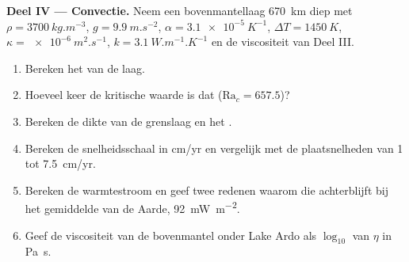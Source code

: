 \begin{problem}
\medskip\noindent\textbf{Deel IV --- Convectie.} Neem een bovenmantellaag
\qty{670}{km} diep met $\rho = \qty{3700}{kg.m^{-3}}$, $g =
\qty{9.9}{m.s^{-2}}$, $\alpha = \qty{3.1e-5}{K^{-1}}$, $\Delta T =
\qty{1450}{K}$, $\kappa = \qty{e-6}{m^2.s^{-1}}$, $k = \qty{3.1}{W.m^{-1}.K^{-1}}$
en de viscositeit van Deel III.
\begin{enumerate}[resume]
  \item Bereken het  van de laag.
  \item Hoeveel keer de kritische waarde is dat ($\mathrm{Ra}_c = 657.5$)?
  \item Bereken de dikte van de grenslaag en het .
  \item Bereken de snelheidsschaal in \unit{cm/yr} en vergelijk met de plaatsnelheden
        van 1 tot \qty{7.5}{cm/yr}.
  \item Bereken de warmtestroom en geef twee redenen waarom die achterblijft bij het
        gemiddelde van de Aarde, \qty{92}{mW.m^{-2}}.
  \item Geef de viscositeit van de bovenmantel onder Lake Ardo als $\log_{10}$ van
        $\eta$ in \unit{Pa.s}.
\end{enumerate}
\end{problem}
